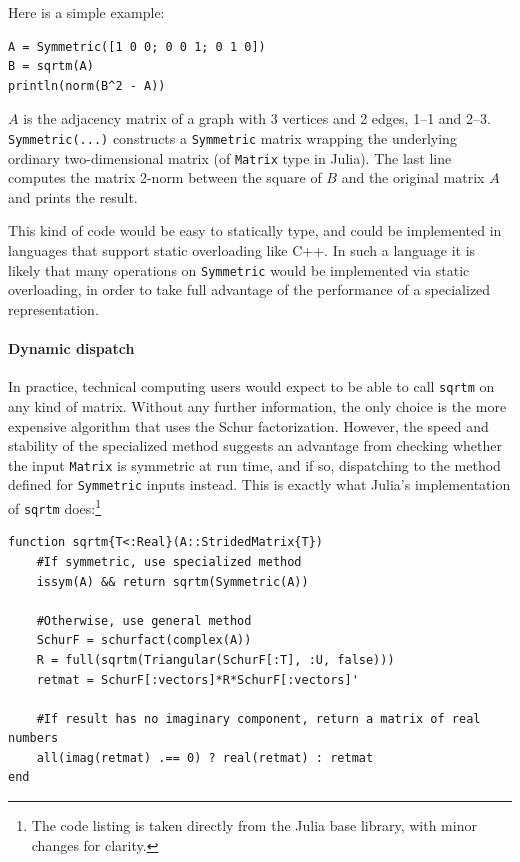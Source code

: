 Here is a simple example:
%
\begin{lstlisting}
A = Symmetric([1 0 0; 0 0 1; 0 1 0])
B = sqrtm(A)
println(norm(B^2 - A))
\end{lstlisting}
%
$A$ is the adjacency matrix of a graph with 3 vertices and 2 edges, 1--1 and
2--3. \lstinline|Symmetric(...)| constructs a \lstinline|Symmetric| matrix
wrapping the underlying ordinary two-dimensional matrix (of
\lstinline|Matrix| type in Julia). The last line computes the matrix 2-norm
between the square of $B$ and the original matrix $A$ and prints the result.

This kind of code would be easy to statically type, and could be implemented
in languages that support static overloading like C++.
In such a language it is likely that many operations on \lstinline|Symmetric|
would be implemented via static overloading, in order to take full advantage
of the performance of a specialized representation.

\paragraph{Dynamic dispatch}

In practice, technical computing users would expect to be able to call
\lstinline|sqrtm| on any kind of matrix.
Without any further information, the only choice is the
more expensive algorithm that uses the Schur factorization. However, the speed
and stability of the specialized method suggests an advantage from checking whether
the input \lstinline|Matrix| is symmetric at run time, and if so, dispatching
to the method defined for \lstinline|Symmetric| inputs instead. This is
exactly what Julia's implementation of \lstinline|sqrtm| does:\footnote{
The code listing is taken directly from the Julia base library, with minor
changes for clarity.}
%
\begin{lstlisting}
function sqrtm{T<:Real}(A::StridedMatrix{T})
	#If symmetric, use specialized method
	issym(A) && return sqrtm(Symmetric(A))

	#Otherwise, use general method
	SchurF = schurfact(complex(A))
	R = full(sqrtm(Triangular(SchurF[:T], :U, false)))
	retmat = SchurF[:vectors]*R*SchurF[:vectors]'

	#If result has no imaginary component, return a matrix of real numbers
	all(imag(retmat) .== 0) ? real(retmat) : retmat
end
\end{lstlisting}

